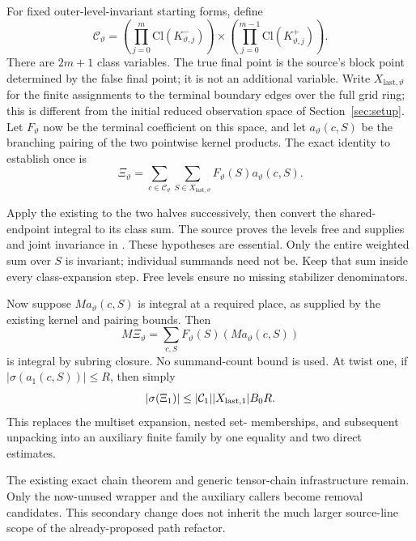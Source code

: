 For fixed outer-level-invariant starting forms, define
\[
 \mathcal C_\vartheta=
 \left(\prod_{j=0}^{m}\mathrm{Cl}(K^-_{\vartheta,j})\right)
 \times
 \left(\prod_{j=0}^{m-1}\mathrm{Cl}(K^+_{\vartheta,j})\right).
\]
There are $2m+1$ class variables. The true final point is the source's block point determined by the false final point; it is not an additional variable. Write $X_{\mathrm{last},\vartheta}$ for the finite assignments to the terminal boundary edges over the full grid ring; this is different from the initial reduced observation space of Section~\ref{sec:setup}. Let $F_\vartheta$ now be the terminal coefficient on this space, and let $a_\vartheta(c,S)$ be the branching pairing of the two pointwise kernel products. The exact identity to establish once is
\begin{equation}\label{eq:terminal}
 \Xi_\vartheta=\sum_{c\in\mathcal C_\vartheta}\sum_{S\in X_{\mathrm{last},\vartheta}}
           F_\vartheta(S)a_\vartheta(c,S).
\end{equation}

Apply the existing  to the two halves successively, then convert the shared-endpoint integral to its class sum. The source proves the levels free and supplies  and joint invariance in . These hypotheses are essential. Only the entire weighted sum over $S$ is invariant; individual summands need not be. Keep that sum inside every class-expansion step. Free levels ensure no missing stabilizer denominators.

Now suppose $M a_\vartheta(c,S)$ is integral at a required place, as supplied by the existing kernel and pairing bounds. Then
\[
 M\Xi_\vartheta=\sum_{c,S}F_\vartheta(S)
                            (M a_\vartheta(c,S))
\]
is integral by subring closure. No summand-count bound is used. At twist one, if $|\sigma(a_1(c,S))|\leq R$, then simply
\begin{equation}\label{eq:arch}
 |\sigma(\Xi_1)|\leq\lvert \mathcal C_1\rvert\lvert X_{\mathrm{last},1}\rvert B_0R.
\end{equation}
This replaces the multiset expansion, nested set- memberships, and subsequent unpacking into an auxiliary finite family by one equality and two direct estimates.

The existing exact chain theorem and generic tensor-chain infrastructure remain. Only the now-unused  wrapper and the auxiliary callers become removal candidates. This secondary change does not inherit the much larger source-line scope of the already-proposed path refactor.

